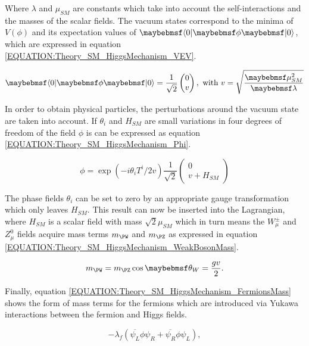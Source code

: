 Where $\lambda$ and $\mu_{SM}$ are constants which take into account the self-interactions and the masses of the scalar fields. The vacuum states correspond to the minima of $V(\phi)$ and its expectation values of $\bra{0}\phi\ket{0}$, which are expressed in equation \ref{EQUATION:Theory_SM_HiggsMechanism_VEV}.

\begin{equation}
\bra{0}\phi\ket{0} = \frac{1}{\sqrt{2}} \begin{pmatrix}0 \\ v \end{pmatrix},\text{ with } v=\sqrt{\frac{\mu_{SM}^{2}}{\lambda}} 
\label{EQUATION:Theory_SM_HiggsMechanism_VEV}
\end{equation}

In order to obtain physical particles, the perturbations around the vacuum state are taken into account. If $\theta_{i}$ and $H_{SM}$ are small variations in four degrees of freedom of the field $\phi$ is can be expressed as equation \ref{EQUATION:Theory_SM_HiggsMechanism_Phi}.

\begin{equation}
\phi = \exp(-i\theta_{i}T^{i}/2v)\frac{1}{\sqrt{2}}\begin{pmatrix} 0 \\ v+H_{SM} \end{pmatrix}
\label{EQUATION:Theory_SM_HiggsMechanism_Phi}
\end{equation}

The phase fields $\theta_{i}$ can be set to zero by an appropriate gauge transformation which only leaves $H_{SM}$. This result can now be inserted into the Lagrangian, where $H_{SM}$ is a scalar field with mass $\sqrt{2}\mu_{SM}$ which in turn means the $W_{\mu}^{\pm}$ and $Z_{\mu}^{0}$ fields acquire mass terms $m_{\PW}$ and $m_{\PZ}$ as expressed in equation \ref{EQUATION:Theory_SM_HiggsMechanism_WeakBosonMass}.

\begin{equation}
m_{\PW} = m_{\PZ}\cos{\theta_{W}}=\frac{gv}{2}.
\label{EQUATION:Theory_SM_HiggsMechanism_WeakBosonMass}
\end{equation}

Finally, equation \ref{EQUATION:Theory_SM_HiggsMechanism_FermionsMass} shows the form of mass terms for the fermions which are introduced via Yukawa interactions between the fermion and Higgs fields.

\begin{equation}
-\lambda_{f}( \overline{\psi_{L}}\phi\psi_{R} + \overline{\psi_{R}}\phi\psi_{L}),  
\label{EQUATION:Theory_SM_HiggsMechanism_FermionsMass}
\end{equation}

